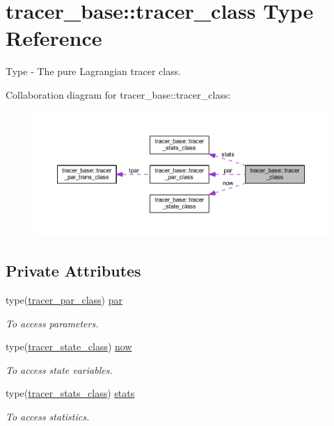 \hypertarget{structtracer__base_1_1tracer__class}{}\section{tracer\+\_\+base\+:\+:tracer\+\_\+class Type Reference}
\label{structtracer__base_1_1tracer__class}


Type -\/ The pure Lagrangian tracer class.  




Collaboration diagram for tracer\+\_\+base\+:\+:tracer\+\_\+class\+:\nopagebreak
\begin{figure}[H]
\begin{center}
\leavevmode
\includegraphics[width=350pt]{structtracer__base_1_1tracer__class__coll__graph}
\end{center}
\end{figure}
\subsection*{Private Attributes}
\begin{DoxyCompactItemize}
\item 
type(\mbox{\hyperlink{structtracer__base_1_1tracer__par__class}{tracer\+\_\+par\+\_\+class}}) \mbox{\hyperlink{structtracer__base_1_1tracer__class_a65acca4d35b24ec0b60eb32574004364}{par}}
\begin{DoxyCompactList}\small\item\em To access parameters. \end{DoxyCompactList}\item 
type(\mbox{\hyperlink{structtracer__base_1_1tracer__state__class}{tracer\+\_\+state\+\_\+class}}) \mbox{\hyperlink{structtracer__base_1_1tracer__class_aa0489335062707afec2dbbb978f0c68d}{now}}
\begin{DoxyCompactList}\small\item\em To access state variables. \end{DoxyCompactList}\item 
type(\mbox{\hyperlink{structtracer__base_1_1tracer__stats__class}{tracer\+\_\+stats\+\_\+class}}) \mbox{\hyperlink{structtracer__base_1_1tracer__class_a44167d106dc210e434106087e4a19578}{stats}}
\begin{DoxyCompactList}\small\item\em To access statistics. \end{DoxyCompactList}\end{DoxyCompactItemize}



